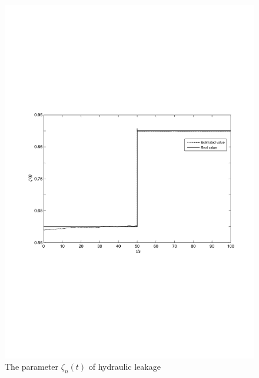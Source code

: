 \documentclass{article}
\begin{document}
\begin{figure}[!htb]
  \centering
  \includegraphics[width=\hsize]{fig5b.pdf}
  \caption{The parameter $\zeta_n(t)$ of hydraulic leakage}
  \label{fig:5b}
\end{figure}
\end{document}
